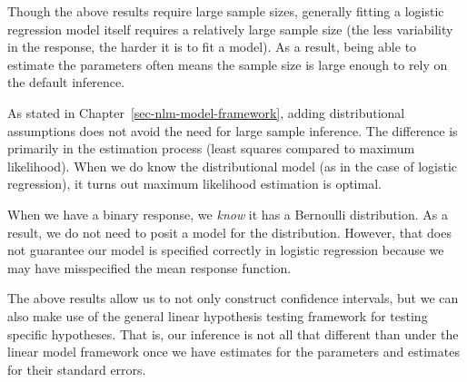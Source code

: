 \documentclass[
  letterpaper,
  DIV=11,
  numbers=noendperiod]{scrreprt}
\theoremstyle{definition}
\theoremstyle{definition}
\theoremstyle{remark}
\begin{document}
\begin{tcolorbox}[enhanced jigsaw, left=2mm, toprule=.15mm, arc=.35mm, breakable, opacitybacktitle=0.6, opacityback=0, rightrule=.15mm, colbacktitle=quarto-callout-note-color!10!white, coltitle=black, leftrule=.75mm, toptitle=1mm, colframe=quarto-callout-note-color-frame, titlerule=0mm, title=\textcolor{quarto-callout-note-color}{\faInfo}\hspace{0.5em}{Note}, bottomrule=.15mm, colback=white, bottomtitle=1mm]

Though the above results require large sample sizes, generally fitting a
logistic regression model itself requires a relatively large sample size
(the less variability in the response, the harder it is to fit a model).
As a result, being able to estimate the parameters often means the
sample size is large enough to rely on the default inference.

\end{tcolorbox}

As stated in Chapter~\ref{sec-nlm-model-framework}, adding
distributional assumptions does not avoid the need for large sample
inference. The difference is primarily in the estimation process (least
squares compared to maximum likelihood). When we do know the
distributional model (as in the case of logistic regression), it turns
out maximum likelihood estimation is optimal.

\begin{tcolorbox}[enhanced jigsaw, left=2mm, toprule=.15mm, arc=.35mm, breakable, opacitybacktitle=0.6, opacityback=0, rightrule=.15mm, colbacktitle=quarto-callout-warning-color!10!white, coltitle=black, leftrule=.75mm, toptitle=1mm, colframe=quarto-callout-warning-color-frame, titlerule=0mm, title=\textcolor{quarto-callout-warning-color}{\faExclamationTriangle}\hspace{0.5em}{Warning}, bottomrule=.15mm, colback=white, bottomtitle=1mm]

When we have a binary response, we \emph{know} it has a Bernoulli
distribution. As a result, we do not need to posit a model for the
distribution. However, that does not guarantee our model is specified
correctly in logistic regression because we may have misspecified the
mean response function.

\end{tcolorbox}

The above results allow us to not only construct confidence intervals,
but we can also make use of the general linear hypothesis testing
framework for testing specific hypotheses. That is, our inference is not
all that different than under the linear model framework once we have
estimates for the parameters and estimates for their standard errors.
\end{document}
